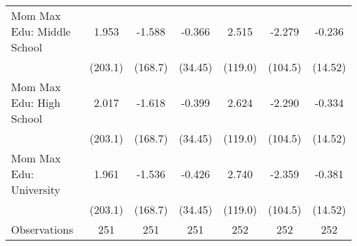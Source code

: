 {\begin{tabular}{l*{6}{c}}
\addlinespace
Mom Max Edu: Middle School&       1.953         &      -1.588         &      -0.366         &       2.515         &      -2.279         &      -0.236         \\
                    &     (203.1)         &     (168.7)         &     (34.45)         &     (119.0)         &     (104.5)         &     (14.52)         \\
\addlinespace
Mom Max Edu: High School&       2.017         &      -1.618         &      -0.399         &       2.624         &      -2.290         &      -0.334         \\
                    &     (203.1)         &     (168.7)         &     (34.45)         &     (119.0)         &     (104.5)         &     (14.52)         \\
\addlinespace
Mom Max Edu: University&       1.961         &      -1.536         &      -0.426         &       2.740         &      -2.359         &      -0.381         \\
                    &     (203.1)         &     (168.7)         &     (34.45)         &     (119.0)         &     (104.5)         &     (14.52)         \\
\midrule
Observations        &         251         &         251         &         251         &         252         &         252         &         252         \\
\bottomrule
\end{tabular}
}
